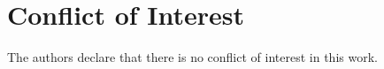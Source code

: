 \section*{Conflict of Interest}

    The authors declare that there is no conflict of interest in this work.


